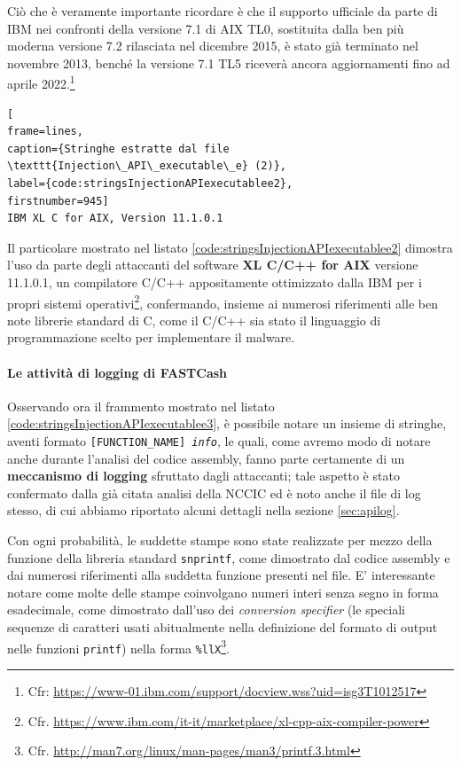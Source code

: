 \documentclass[10pt,a4paper, titlepage]{report}
\begin{document}
Ciò che è veramente importante ricordare è che il supporto ufficiale da parte di IBM nei confronti della versione 7.1 di AIX TL0, sostituita dalla ben più moderna versione 7.2 rilasciata nel dicembre 2015, è stato già terminato nel novembre 2013, benché la versione 7.1 TL5 riceverà ancora aggiornamenti fino ad aprile 2022.\footnote{Cfr: \url{https://www-01.ibm.com/support/docview.wss?uid=isg3T1012517}}

\begin{lstlisting}[
frame=lines, 
caption={Stringhe estratte dal file \texttt{Injection\_API\_executable\_e} (2)}, 
label={code:stringsInjectionAPIexecutablee2},
firstnumber=945]
IBM XL C for AIX, Version 11.1.0.1
\end{lstlisting}

Il particolare mostrato nel listato \ref{code:stringsInjectionAPIexecutablee2} dimostra l'uso da parte degli attaccanti del software \textbf{XL C/C++ for AIX} versione 11.1.0.1, un compilatore C/C++ appositamente ottimizzato dalla IBM per i propri sistemi operativi\footnote{Cfr. \url{https://www.ibm.com/it-it/marketplace/xl-cpp-aix-compiler-power}}, confermando, insieme ai numerosi riferimenti alle ben note librerie standard di C, come il C/C++ sia stato il linguaggio di programmazione scelto per implementare il malware.

\paragraph{Le attività di logging di FASTCash}

Osservando ora il frammento mostrato nel listato \ref{code:stringsInjectionAPIexecutablee3}, è possibile notare un insieme di stringhe, aventi formato \texttt{[FUNCTION\_NAME] \textit{info}}, le quali, come avremo modo di notare anche durante l'analisi del codice assembly, fanno parte certamente di un \textbf{meccanismo di logging} sfruttato dagli attaccanti; tale aspetto è stato confermato dalla già citata analisi della NCCIC ed è noto anche il file di log stesso, di cui abbiamo riportato alcuni dettagli nella sezione \ref{sec:apilog}.

Con ogni probabilità, le suddette stampe sono state realizzate per mezzo della funzione della libreria standard \texttt{snprintf}, come dimostrato dal codice assembly e dai numerosi riferimenti alla suddetta funzione presenti nel file. E' interessante notare come molte delle stampe coinvolgano numeri interi senza segno in forma esadecimale, come dimostrato dall'uso dei \textit{conversion specifier} (le speciali sequenze di caratteri usati abitualmente nella definizione del formato di output nelle funzioni \texttt{printf}) nella forma \texttt{\%llX}\footnote{Cfr. \url{http://man7.org/linux/man-pages/man3/printf.3.html}}.
\end{document}
